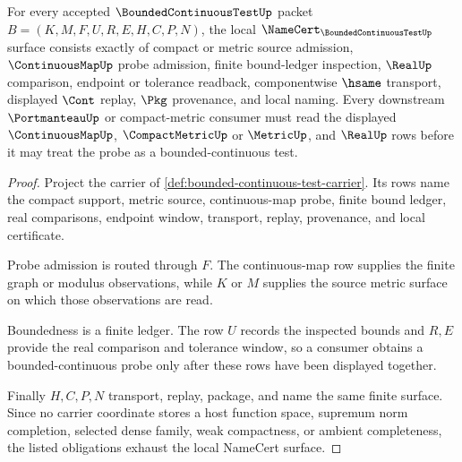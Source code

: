 \begin{theorem}
\label{thm:bounded-continuous-test-namecert-obligations}
For every accepted $\BoundedContinuousTestUp$ packet
$B=(K,M,F,U,R,E,H,C,P,N)$, the local
$\NameCert_{\BoundedContinuousTestUp}$ surface consists exactly of compact or
metric source admission, $\ContinuousMapUp$ probe admission, finite bound-ledger
inspection, $\RealUp$ comparison, endpoint or tolerance readback,
componentwise $\hsame$ transport, displayed $\Cont$ replay, $\Pkg$ provenance,
and local naming. Every downstream $\PortmanteauUp$ or compact-metric consumer
must read the displayed $\ContinuousMapUp$, $\CompactMetricUp$ or $\MetricUp$,
and $\RealUp$ rows before it may treat the probe as a bounded-continuous test.
\end{theorem}
\begin{proof}
Project the carrier of \autoref{def:bounded-continuous-test-carrier}. Its rows
name the compact support, metric source, continuous-map probe, finite bound
ledger, real comparisons, endpoint window, transport, replay, provenance, and
local certificate.

Probe admission is routed through $F$. The continuous-map row supplies the
finite graph or modulus observations, while $K$ or $M$ supplies the source
metric surface on which those observations are read.

Boundedness is a finite ledger. The row $U$ records the inspected bounds and
$R,E$ provide the real comparison and tolerance window, so a consumer obtains a
bounded-continuous probe only after these rows have been displayed together.

Finally $H,C,P,N$ transport, replay, package, and name the same finite surface.
Since no carrier coordinate stores a host function space, supremum norm
completion, selected dense family, weak compactness, or ambient completeness,
the listed obligations exhaust the local NameCert surface.
\end{proof}



